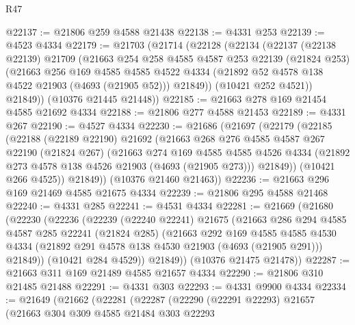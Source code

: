 \begin{lexlean}{R47}
\begin{coremodule}
@22137 := @21806 @259 @4588 @21438
@22138 := @4331 @253
@22139 := @4523 @4334
@22179 := @21703
    (@21714
      (@22128
        (@22134
          (@22137
            (@22138 @22139)
            @21709
            (@21663
              @254
              @258
              @4585
              @4587
              @253
              @22139
              (@21824 @253)
              (@21663
                @256
                @169
                @4585
                @4585
                @4522
                @4334
                (@21892 @52 @4578 @138 @4522 @21903 (@4693 (@21905 @52)))
                @21849))
            (@10421 @252 @4521))
          @21849))
      (@10376 @21445 @21448))
@22185 := @21663 @278 @169 @21454 @4585 @21692 @4334
@22188 := @21806 @277 @4588 @21453
@22189 := @4331 @267
@22190 := @4527 @4334
@22230 := @21686
    (@21697
      (@22179
        (@22185
          (@22188
            (@22189 @22190)
            @21692
            (@21663
              @268
              @276
              @4585
              @4587
              @267
              @22190
              (@21824 @267)
              (@21663
                @274
                @169
                @4585
                @4585
                @4526
                @4334
                (@21892 @273 @4578 @138 @4526 @21903 (@4693 (@21905 @273)))
                @21849))
            (@10421 @266 @4525))
          @21849))
      (@10376 @21460 @21463))
@22236 := @21663 @296 @169 @21469 @4585 @21675 @4334
@22239 := @21806 @295 @4588 @21468
@22240 := @4331 @285
@22241 := @4531 @4334
@22281 := @21669
    (@21680
      (@22230
        (@22236
          (@22239
            (@22240 @22241)
            @21675
            (@21663
              @286
              @294
              @4585
              @4587
              @285
              @22241
              (@21824 @285)
              (@21663
                @292
                @169
                @4585
                @4585
                @4530
                @4334
                (@21892 @291 @4578 @138 @4530 @21903 (@4693 (@21905 @291)))
                @21849))
            (@10421 @284 @4529))
          @21849))
      (@10376 @21475 @21478))
@22287 := @21663 @311 @169 @21489 @4585 @21657 @4334
@22290 := @21806 @310 @21485 @21488
@22291 := @4331 @303
@22293 := @4331 @9900 @4334
@22334 := @21649
    (@21662
      (@22281
        (@22287
          (@22290
            (@22291 @22293)
            @21657
            (@21663
              @304
              @309
              @4585
              @21484
              @303
              @22293

\end{coremodule}
\end{lexlean}

